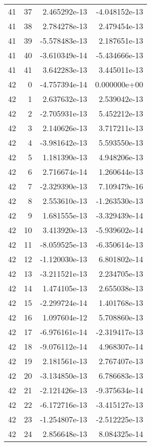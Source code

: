 \begin{tabular}{rrrr}
  41 &   37 &  2.465292e-13 & -4.048152e-13 \\
  41 &   38 &  2.784278e-13 &  2.479454e-13 \\
  41 &   39 & -5.578483e-13 &  2.187651e-13 \\
  41 &   40 & -3.610349e-14 & -5.434666e-13 \\
  41 &   41 &  3.642283e-13 &  3.445011e-13 \\
  42 &    0 & -4.757394e-14 &  0.000000e+00 \\
  42 &    1 &  2.637632e-13 &  2.539042e-13 \\
  42 &    2 & -2.705931e-13 &  5.452212e-13 \\
  42 &    3 &  2.140626e-13 &  3.717211e-13 \\
  42 &    4 & -3.981642e-13 &  5.593550e-13 \\
  42 &    5 &  1.181390e-13 &  4.948206e-13 \\
  42 &    6 &  2.716674e-14 &  1.260644e-13 \\
  42 &    7 & -2.329390e-13 &  7.109479e-16 \\
  42 &    8 &  2.553610e-13 & -1.263530e-13 \\
  42 &    9 &  1.681555e-13 & -3.329439e-14 \\
  42 &   10 &  3.413920e-13 & -5.939602e-14 \\
  42 &   11 & -8.059525e-13 & -6.350614e-13 \\
  42 &   12 & -1.120030e-13 &  6.801802e-14 \\
  42 &   13 & -3.211521e-13 &  2.234705e-13 \\
  42 &   14 &  1.474105e-13 &  2.655038e-13 \\
  42 &   15 & -2.299724e-14 &  1.401768e-13 \\
  42 &   16 &  1.097604e-12 &  5.708860e-13 \\
  42 &   17 & -6.976161e-14 & -2.319417e-13 \\
  42 &   18 & -9.076112e-14 &  4.968307e-14 \\
  42 &   19 &  2.181561e-13 &  2.767407e-13 \\
  42 &   20 & -3.134850e-13 &  6.786683e-13 \\
  42 &   21 & -2.121426e-13 & -9.375634e-14 \\
  42 &   22 & -6.172716e-13 & -3.415127e-13 \\
  42 &   23 & -1.254807e-13 & -2.512225e-13 \\
  42 &   24 &  2.856648e-13 &  8.084325e-14 \\

\end{tabular}
